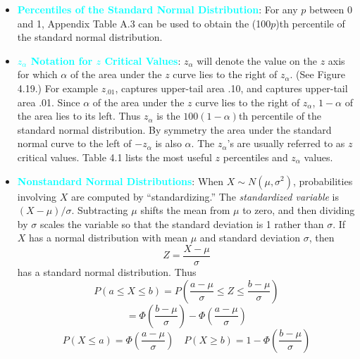 \documentclass{report}
\begin{document}
\begin{itemize}
        \bigbreak \noindent 
        \bigbreak \noindent 
        \bigbreak \noindent 
    \item \textbf{\textcolor{cyan}{Percentiles of the Standard Normal Distribution}}:
        For any $p$ between 0 and 1, Appendix Table A.3 can be used to obtain the (100$p$)th percentile of the standard normal distribution.
        \pagebreak 
    \item \textbf{\textcolor{cyan}{$z_{\alpha}$ Notation for $z$ Critical Values}}:
        \( z_{\alpha} \) will denote the value on the \( z \) axis for which \( \alpha \) of the area under the \( z \) curve lies to the right of \( z_{\alpha} \). (See Figure 4.19.)
        \bigbreak \noindent 
        For example $z_{.01} $, captures upper-tail area .10, and captures upper-tail area .01.
        \bigbreak \noindent 
        \bigbreak \noindent 
        Since \( \alpha \) of the area under the \( z \) curve lies to the right of \( z_{\alpha} \), \( 1 - \alpha \) of the area lies to its left. Thus \( z_{\alpha} \) is the \( 100(1 - \alpha) \)th percentile of the standard normal distribution. By symmetry the area under the standard normal curve to the left of \( -z_{\alpha} \) is also \( \alpha \). The \( z_{\alpha} \)'s are usually referred to as \( z \) critical values. Table 4.1 lists the most useful \( z \) percentiles and \( z_{\alpha} \) values.
        \bigbreak \noindent 
    \item \textbf{\textcolor{cyan}{Nonstandard Normal Distributions}}:
        When \( X \sim N(\mu, \sigma^2) \), probabilities involving \( X \) are computed by “standardizing.” The \textit{standardized variable} is \( (X - \mu)/\sigma \). Subtracting \( \mu \) shifts the mean from \( \mu \) to zero, and then dividing by \( \sigma \) scales the variable so that the standard deviation is 1 rather than \( \sigma \).
        \bigbreak \noindent 
        If \( X \) has a normal distribution with mean \( \mu \) and standard deviation \( \sigma \), then
        \[
            Z = \frac{X - \mu}{\sigma}
        \]
        has a standard normal distribution. Thus
        \[
            P(a \leq X \leq b) = P\left( \frac{a - \mu}{\sigma} \leq Z \leq \frac{b - \mu}{\sigma} \right)
        \]
        \[
            = \Phi\left( \frac{b - \mu}{\sigma} \right) - \Phi\left( \frac{a - \mu}{\sigma} \right)
        \]
        \[
            P(X \leq a) = \Phi\left( \frac{a - \mu}{\sigma} \right) \quad P(X \geq b) = 1 - \Phi\left( \frac{b - \mu}{\sigma} \right)
\]
\end{itemize}
\end{document}
